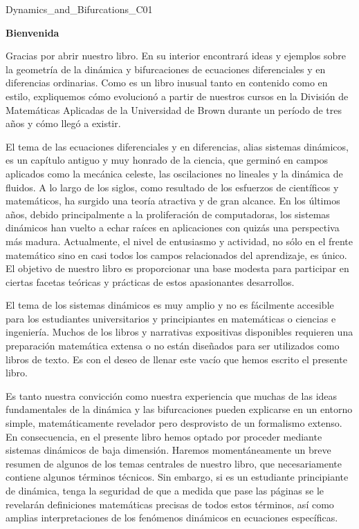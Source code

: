 \documentclass[]{article}
\begin{document}
Dynamics_and_Bifurcations_C01

\textbf{Bienvenida}

\hfill

Gracias por abrir nuestro libro. En su interior encontrará ideas y ejemplos sobre la geometría de la dinámica y bifurcaciones de ecuaciones diferenciales y en diferencias ordinarias. Como es un libro inusual tanto en contenido como en estilo, expliquemos cómo evolucionó a partir de nuestros cursos en la División de Matemáticas Aplicadas de la Universidad de Brown durante un período de tres años y cómo llegó a existir.

\hfill

El tema de las ecuaciones diferenciales y en diferencias, alias sistemas dinámicos, es un capítulo antiguo y muy honrado de la ciencia, que germinó en campos aplicados como la mecánica celeste, las oscilaciones no lineales y la dinámica de fluidos. A lo largo de los siglos, como resultado de los esfuerzos de científicos y matemáticos, ha surgido una teoría atractiva y de gran alcance. En los últimos años, debido principalmente a la proliferación de computadoras, los sistemas dinámicos han vuelto a echar raíces en aplicaciones con quizás una perspectiva más madura. Actualmente, el nivel de entusiasmo y actividad, no sólo en el frente matemático sino en casi todos los campos relacionados del aprendizaje, es único. El objetivo de nuestro libro es proporcionar una base modesta para participar en ciertas facetas teóricas y prácticas de estos apasionantes desarrollos.

\hfill

El tema de los sistemas dinámicos es muy amplio y no es fácilmente accesible para los estudiantes universitarios y principiantes en matemáticas o ciencias e ingeniería. Muchos de los libros y narrativas expositivas disponibles requieren una preparación matemática extensa o no están diseñados para ser utilizados como libros de texto. Es con el deseo de llenar este vacío que hemos escrito el presente libro.

\hfill

Es tanto nuestra convicción como nuestra experiencia que muchas de las ideas fundamentales de la dinámica y las bifurcaciones pueden explicarse en un entorno simple, matemáticamente revelador pero desprovisto de un formalismo extenso. En consecuencia, en el presente libro hemos optado por proceder mediante sistemas dinámicos de baja dimensión. Haremos momentáneamente un breve resumen de algunos de los temas centrales de nuestro libro, que necesariamente contiene algunos términos técnicos. Sin embargo, si es un estudiante principiante de dinámica, tenga la seguridad de que a medida que pase las páginas se le revelarán definiciones matemáticas precisas de todos estos términos, así como amplias interpretaciones de los fenómenos dinámicos en ecuaciones específicas.
\end{document}
